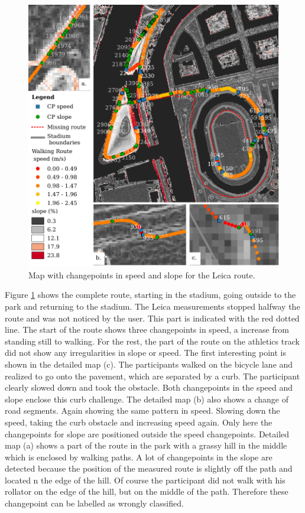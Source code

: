\begin{figure}[ht]
\includegraphics[width=\textwidth]{img/R_leicaroute.pdf}
\centering
\caption{Map with changepoints in speed and slope for the Leica route.\label{routeLeicaMap}}
\end{figure}

Figure \ref{routeLeicaMap} shows the complete route, starting in the stadium, going outside to the park and returning to the stadium. The Leica measurements stopped halfway the route and was not noticed by the user. This part is indicated with the red dotted line. The start of the route shows three changepoints in speed, a increase from standing still to walking. For the rest, the part of the route on the athletics track did not show any irregularities in slope or speed. The first interesting point is shown in the detailed map (c). The participants walked on the bicycle lane and realized to go onto the pavement, which are separated by a curb. The participant clearly slowed down and took the obstacle. Both changepoints in the speed and slope enclose this curb challenge. 
The detailed map (b) also shows a change of road segments. Again showing the same pattern in speed. Slowing down the speed, taking the curb obstacle and increasing speed again. Only here the changepoints for slope are positioned outside the speed changepoints. Detailed map (a) shows a part of the route in the park with a grassy hill in the middle which is enclosed by walking paths. A lot of changepoints in the slope are detected because the position of the measured route is slightly off the path and located n the edge of the hill. Of course the participant did not walk with his rollator on the edge of the hill, but on the middle of the path. Therefore these changepoint can be labelled as wrongly classified. 


